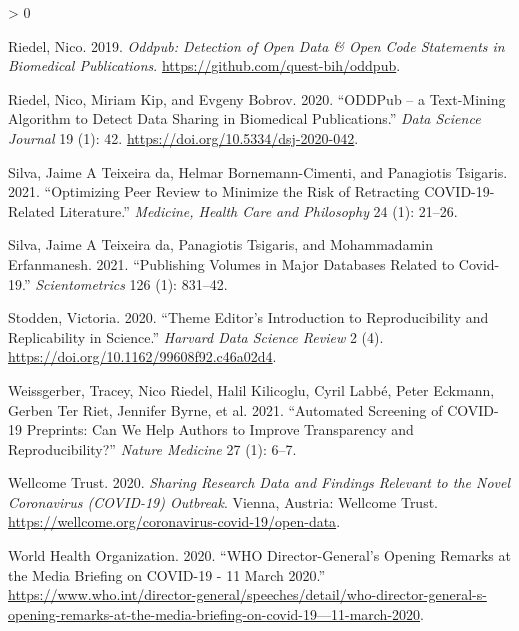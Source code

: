 \documentclass[
]{article}
\newlength{\cslhangindent}
\newenvironment{CSLReferences}[2] %
 {%
  \setlength{\parindent}{0pt}
  \ifodd #1 \everypar{\setlength{\hangindent}{\cslhangindent}}\ignorespaces\fi
  \ifnum #2 > 0
  \setlength{\parskip}{#2\baselineskip}
  \fi
 }%
 {}
\begin{document}
\begin{CSLReferences}{1}{0}
\leavevmode\hypertarget{ref-citeODDPubpackage}{}%
Riedel, Nico. 2019. \emph{Oddpub: Detection of Open Data \& Open Code Statements in Biomedical Publications}. \url{https://github.com/quest-bih/oddpub}.

\leavevmode\hypertarget{ref-citePDDPub}{}%
Riedel, Nico, Miriam Kip, and Evgeny Bobrov. 2020. {``ODDPub -- a Text-Mining Algorithm to Detect Data Sharing in Biomedical Publications.''} \emph{Data Science Journal} 19 (1): 42. \url{https://doi.org/10.5334/dsj-2020-042}.

\leavevmode\hypertarget{ref-da2021optimizing}{}%
Silva, Jaime A Teixeira da, Helmar Bornemann-Cimenti, and Panagiotis Tsigaris. 2021. {``Optimizing Peer Review to Minimize the Risk of Retracting COVID-19-Related Literature.''} \emph{Medicine, Health Care and Philosophy} 24 (1): 21--26.

\leavevmode\hypertarget{ref-da2021publishing}{}%
Silva, Jaime A Teixeira da, Panagiotis Tsigaris, and Mohammadamin Erfanmanesh. 2021. {``Publishing Volumes in Major Databases Related to Covid-19.''} \emph{Scientometrics} 126 (1): 831--42.

\leavevmode\hypertarget{ref-Stodden2020Theme}{}%
Stodden, Victoria. 2020. {``Theme Editor's Introduction to Reproducibility and Replicability in Science.''} \emph{Harvard Data Science Review} 2 (4). \url{https://doi.org/10.1162/99608f92.c46a02d4}.

\leavevmode\hypertarget{ref-weissgerber2021automated}{}%
Weissgerber, Tracey, Nico Riedel, Halil Kilicoglu, Cyril Labbé, Peter Eckmann, Gerben Ter Riet, Jennifer Byrne, et al. 2021. {``Automated Screening of COVID-19 Preprints: Can We Help Authors to Improve Transparency and Reproducibility?''} \emph{Nature Medicine} 27 (1): 6--7.

\leavevmode\hypertarget{ref-citeWellcome}{}%
Wellcome Trust. 2020. \emph{Sharing Research Data and Findings Relevant to the Novel Coronavirus (COVID-19) Outbreak}. Vienna, Austria: Wellcome Trust. \url{https://wellcome.org/coronavirus-covid-19/open-data}.

\leavevmode\hypertarget{ref-citeWHOtimeline}{}%
World Health Organization. 2020. {``WHO Director-General's Opening Remarks at the Media Briefing on COVID-19 - 11 March 2020.''} \url{https://www.who.int/director-general/speeches/detail/who-director-general-s-opening-remarks-at-the-media-briefing-on-covid-19—11-march-2020}.

\end{CSLReferences}
\end{document}
